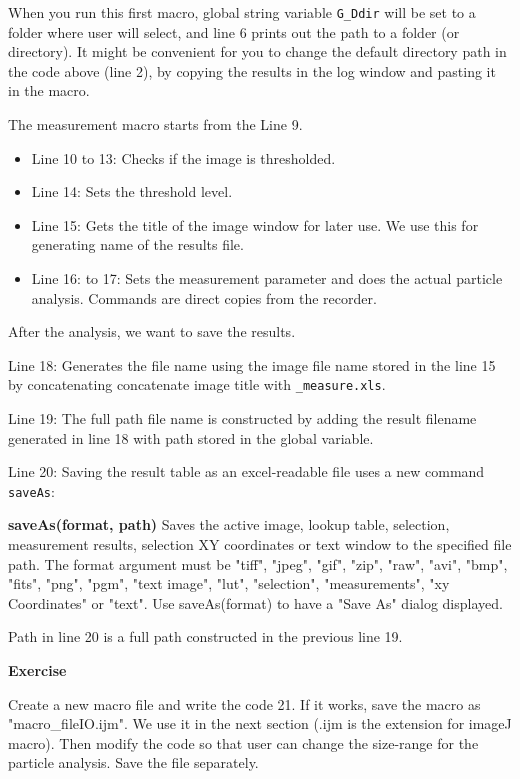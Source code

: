\documentclass[11pt,a4paper,oneside]{report}
\newenvironment{indentexercise}[1]%
{{\setlength{\leftmargin}{2em}}%
\textbf{Exercise \thesubsection-#1}%
\begin{list}{}%
	\item%
}
{\end{list}}
\newenvironment{indentCom}%
{\begin{list}{}%
         {\setlength{\leftmargin}{1em}}%
         \item[]%
}
{\end{list}}
\newcommand{\ilcom}[1]{\texttt{\small#1}}
\begin{document}
When you run this first macro, global string variable \ilcom{G\_Ddir} will be set to a folder where user will select, and line 6 prints out the path to a folder (or directory). It might be convenient for you to change the default directory path in the code above (line 2), by copying the results in the log window and pasting it in the macro. 

The measurement macro starts from the Line 9. 
\begin{itemize}
\item Line 10 to 13: Checks if the image is thresholded. 
\item Line 14: Sets the threshold level. 
\item Line 15: Gets the title of the image window for later use. We use this for generating name of the results file.
\item Line 16: to 17: Sets the measurement parameter and does the actual particle analysis. Commands are direct copies from the recorder. 
\end{itemize}
After the analysis, we want to save the results. 
\begin{itemize}
\item Line 18: Generates the file name using the image file name stored in the line 15 by concatenating concatenate image title with \ilcom{\_measure.xls}. 
\item Line 19: The full path file name is constructed by adding the result filename generated in line 18 with path stored in the global variable. 
\item Line 20: Saving the result table as an excel-readable file uses a new command \ilcom{saveAs}:
\begin{indentCom}
\textbf{saveAs(format, path)}
Saves the active image, lookup table, selection, measurement results, selection XY coordinates or text window to the specified file path. The format argument must be "tiff", "jpeg", "gif", "zip", "raw", "avi", "bmp", "fits", "png", "pgm", "text image", "lut", "selection", "measurements", "xy Coordinates" or "text". Use saveAs(format) to have a "Save As" dialog displayed.
\end{indentCom}
Path in line 20 is a full path constructed in the previous line 19.
\end{itemize}

\begin{indentexercise}{1}
Create a new macro file and write the code 21. If it works, save the macro as "macro\_fileIO.ijm". We use it in the next section (.ijm is the extension for imageJ macro). 
Then modify the code so that user can change the size-range for the particle analysis. Save the file separately.   
\end{indentexercise}
\end{document}
